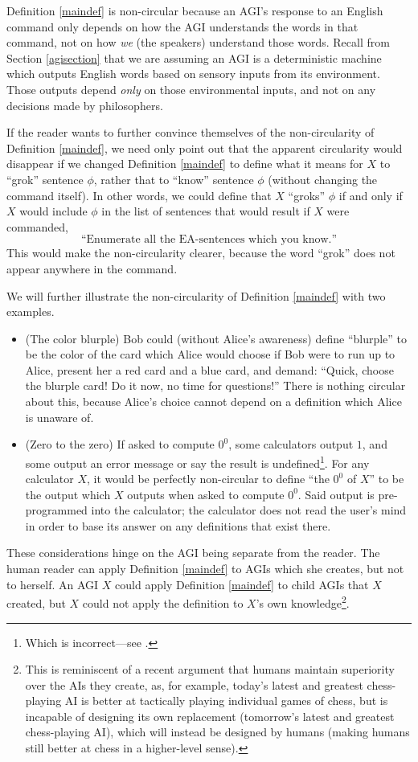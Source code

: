 \documentclass[runningheads]{llncs}
\begin{document}
Definition \ref{maindef} is non-circular because an AGI's response to an English
command only depends on how the AGI understands the words in that command, not
on how \emph{we} (the speakers) understand those words.
Recall from Section \ref{agisection}
that we are assuming an AGI is a deterministic machine which outputs English words
based on sensory inputs from its environment. Those outputs depend \emph{only} on those
environmental inputs, and not on any decisions made by philosophers.

If the reader wants to further convince themselves of the non-circularity of Definition
\ref{maindef}, we need only point out that the apparent circularity would disappear if
we changed Definition \ref{maindef} to define what it means for $X$ to ``grok'' sentence
$\phi$, rather that to ``know'' sentence $\phi$ (without changing the command itself).
In other words, we could define that $X$ ``groks'' $\phi$ if and only if $X$ would include
$\phi$ in the list of sentences that would result if $X$ were commanded,
  \[
  \text{``Enumerate all the EA-sentences which you know.''}
  \]
This would make the non-circularity clearer, because the word ``grok'' does not appear
anywhere in the command.

We will further illustrate the non-circularity of
Definition \ref{maindef} with two examples.
\begin{itemize}
  \item
  (The color blurple) Bob could (without Alice's awareness) define ``blurple'' to be the
  color of the card
  which Alice would choose if Bob were to run up to Alice, present her a red card
  and a blue card, and demand: ``Quick, choose the blurple card! Do it now, no time
  for questions!'' There is nothing circular about this, because Alice's choice
  cannot depend on a definition which Alice is unaware of.
  \item
  (Zero to the zero) If asked to compute $0^0$, some calculators output $1$, and some
  output an error message or say the result is undefined\footnote{Which is incorrect---see
  \cite{knuth}.}. For any calculator $X$, it
  would be perfectly non-circular to define ``the $0^0$ of $X$'' to be the output which
  $X$ outputs when asked to compute $0^0$. Said output is pre-programmed into the
  calculator; the calculator does not read the user's mind in order to base its answer
  on any definitions that exist there.
\end{itemize}

These considerations hinge on the AGI being separate from the reader.
The human reader can apply Definition \ref{maindef} to AGIs which she
creates, but not to herself. An AGI $X$ could apply Definition \ref{maindef} to child
AGIs that $X$ created, but $X$ could not apply the definition to $X$'s
own knowledge\footnote{This is reminiscent of a recent argument \cite{maguire2020people}
that humans maintain superiority over the AIs they create, as, for example,
today's latest and greatest chess-playing AI is better at tactically playing individual
games of chess, but is incapable of designing its own replacement (tomorrow's latest
and greatest chess-playing AI), which will instead be designed by humans (making humans
still better at chess in a higher-level sense).}.
\end{document}
